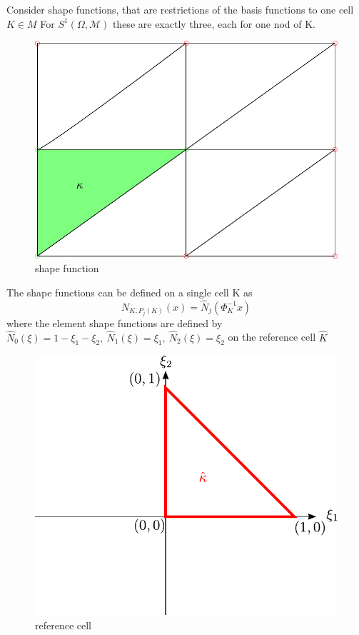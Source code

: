 \documentclass[english]{article}
\theoremstyle{definition}
\theoremstyle{remark}
\newcommand{\M}{\mathcal{M}}
\newcommand{\OO}{\Omega}
\begin{document}
Consider shape functions, that are restrictions of the basis functions to one cell $K \in M$ For $S^1(\OO,\M)$ these are exactly three, each for one nod of K. 
\begin{figure}[H]
  \begin{center}
    \includegraphics[width=\textwidth]{figs/shapeFunctions.pdf}
  \end{center}
  \caption{shape function}
  \label{shape-function-figure}
\end{figure}

The shape functions can be defined on a single cell K as 
$$N_{K,P_j(K)}(x) = \hat N_j(\Phi^{-1}_K x)$$
where the element shape functions are defined by $\hat N_0(\xi ) = 1 - \xi_1-\xi_2, \ \hat N_1(\xi) =\xi_1 , \ \hat N_2(\xi) = \xi_2  $ on the reference cell $\hat K$\\
\begin{figure}[H]
  \begin{center}
    \includegraphics[width=\textwidth]{figs/referenceCellKappaHat.pdf}
  \end{center}
  \caption{reference cell}
  \label{ref-cell-kappa-hat-figure}
\end{figure}
\end{document}

